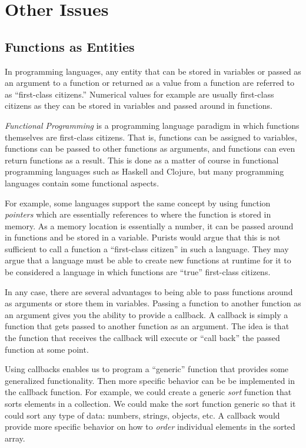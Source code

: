 \section{Other Issues}

\subsection{Functions as Entities}

In programming languages, any entity that can be stored in variables or
passed as an argument to a function or returned as a value from a function
are referred to as ``first-class citizens.''  Numerical values for example are
usually first-class  citizens as they can be stored in variables and passed 
around in functions.

\emph{Functional Programming} is a programming language paradigm in
which functions themselves are first-class citizens.  That is, functions can
be assigned to variables, functions can be passed to other functions as 
arguments, and functions can even return functions as a result.  This is
done as a matter of course in functional programming languages such as
Haskell and Clojure, but many programming languages contain some 
functional aspects.

For example, some languages support the same concept by using function 
\emph{pointers} which are essentially references to where the function is stored in memory.
As a memory location is essentially a number, it can be passed around in
functions and be stored in a variable.  Purists would argue that this is
not sufficient to call a function a ``first-class citizen'' in such a language.
They may argue that a language must be able to create new functions
at runtime for it to be considered a language in which functions are 
``true'' first-class citizens.

In any case, there are several advantages to being able to pass functions
around as arguments or store them in variables.  Passing a function
to another function as an argument gives you the ability to provide a
\gls{callback}.  A callback is simply a function that gets passed to another
function as an argument.  The idea is that the function that receives
the callback will execute or ``call back'' the passed function at some
point.

Using callbacks enables us to program a ``generic'' function that 
provides some generalized functionality.  Then more specific behavior
can be be implemented in the callback function.  For example, we 
could create a generic \emph{sort} function that sorts elements in a
collection.  We could make the sort function generic so that it could
sort any type of data: numbers, strings, objects, etc.  A callback would
provide more specific behavior on how to \emph{order} individual
elements in the sorted array.  

